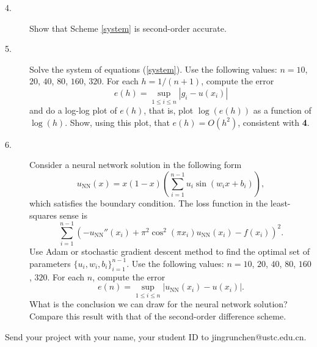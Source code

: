\documentclass[12pt]{article}
\begin{document}
\begin{description}
\item[4.] Show that Scheme  \eqref{system} is second-order accurate.
\item[5.] Solve the system of equations
(\ref{system}). Use the following values: $n=10$, $20$, $40$, $80$, $160$, $320$.
For each $h=1/(n+1)$, compute the error
\begin{equation}
e(h) = \sup_{1\le i \le n} |g_i - u(x_i)|
\end{equation}
and do a log-log plot of $e(h)$, that is, plot $\log(e(h))$ as a
function of $\log(h)$. Show, using this plot, that $e(h) = O(h^2)$,
consistent with \textbf{4}.
\item[6.] Consider a neural network solution in the following form
\begin{equation}
u_{\mathrm{NN}}(x) = x(1-x)\left(\sum_{i=1}^{n-1} u_i \sin(w_i x + b_i) \right),
\end{equation}
which satisfies the boundary condition. The loss function in the least-squares sense is
\begin{equation}
\sum_{i=1}^{n-1} \left( -u_{\mathrm{NN}}''(x_i)+\pi^2 \cos^2(\pi x_i) u_{\mathrm{NN}}(x_i) - f(x_i) \right)^2.
\end{equation}
Use Adam or stochastic gradient descent method to find the optimal set of parameters $\{u_i, w_i, b_i\}_{i=1}^{n-1}$.
Use the following values: $n=10$, $20$, $40$, $80$, $160$, $320$. For each $n$, compute the error
\begin{equation}
e(n) = \sup_{1\le i \le n} |u_{\mathrm{NN}}(x_i) - u(x_i)|.
\end{equation}
What is the conclusion we can draw for the neural network solution? Compare this result with that of the second-order difference scheme.
\end{description}

Send your project with your name, your student ID to jingrunchen@ustc.edu.cn.
\end{document}
